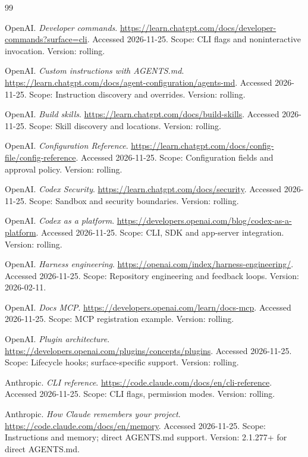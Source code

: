 \documentclass[11pt,oneside,openany]{book}
\begin{document}
\begin{thebibliography}{99}

 OpenAI. \emph{Developer commands}. \url{https://learn.chatgpt.com/docs/developer-commands?surface=cli}. Accessed 2026-11-25. Scope: CLI flags and noninteractive invocation. Version: rolling.

 OpenAI. \emph{Custom instructions with AGENTS.md}. \url{https://learn.chatgpt.com/docs/agent-configuration/agents-md}. Accessed 2026-11-25. Scope: Instruction discovery and overrides. Version: rolling.

 OpenAI. \emph{Build skills}. \url{https://learn.chatgpt.com/docs/build-skills}. Accessed 2026-11-25. Scope: Skill discovery and locations. Version: rolling.

 OpenAI. \emph{Configuration Reference}. \url{https://learn.chatgpt.com/docs/config-file/config-reference}. Accessed 2026-11-25. Scope: Configuration fields and approval policy. Version: rolling.

 OpenAI. \emph{Codex Security}. \url{https://learn.chatgpt.com/docs/security}. Accessed 2026-11-25. Scope: Sandbox and security boundaries. Version: rolling.

 OpenAI. \emph{Codex as a platform}. \url{https://developers.openai.com/blog/codex-as-a-platform}. Accessed 2026-11-25. Scope: CLI, SDK and app-server integration. Version: rolling.

 OpenAI. \emph{Harness engineering}. \url{https://openai.com/index/harness-engineering/}. Accessed 2026-11-25. Scope: Repository engineering and feedback loops. Version: 2026-02-11.

 OpenAI. \emph{Docs MCP}. \url{https://developers.openai.com/learn/docs-mcp}. Accessed 2026-11-25. Scope: MCP registration example. Version: rolling.

 OpenAI. \emph{Plugin architecture}. \url{https://developers.openai.com/plugins/concepts/plugins}. Accessed 2026-11-25. Scope: Lifecycle hooks; surface-specific support. Version: rolling.

 Anthropic. \emph{CLI reference}. \url{https://code.claude.com/docs/en/cli-reference}. Accessed 2026-11-25. Scope: CLI flags, permission modes. Version: rolling.

 Anthropic. \emph{How Claude remembers your project}. \url{https://code.claude.com/docs/en/memory}. Accessed 2026-11-25. Scope: Instructions and memory; direct AGENTS.md support. Version: 2.1.277+ for direct AGENTS.md.


\end{thebibliography}
\end{document}
